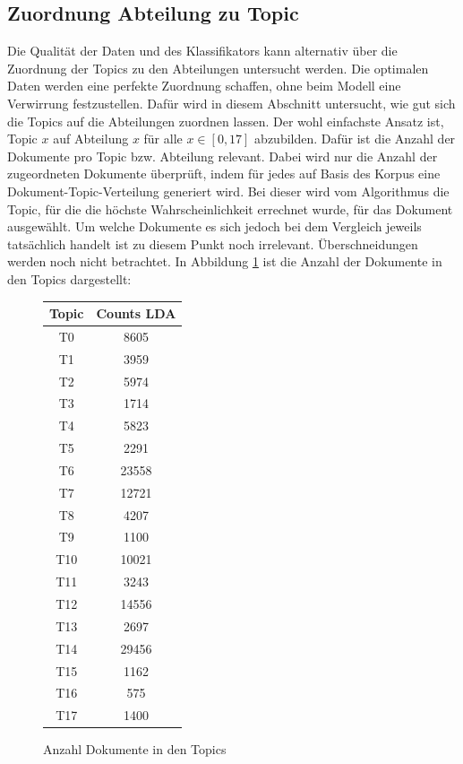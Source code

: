 \documentclass[german,version-2020-11]{uzl-thesis}
\begin{document}
\subsection{Zuordnung Abteilung zu Topic}
Die Qualität der Daten und des Klassifikators kann alternativ über die Zuordnung der Topics zu den Abteilungen untersucht werden. Die optimalen Daten werden eine perfekte Zuordnung schaffen, ohne beim Modell eine Verwirrung festzustellen. Dafür wird in diesem Abschnitt untersucht, wie gut sich die Topics auf die Abteilungen zuordnen lassen. Der wohl einfachste Ansatz ist, Topic $x$ auf Abteilung $x$ für alle $x \in [0,17]$ abzubilden. Dafür ist die Anzahl der Dokumente pro Topic bzw. Abteilung relevant. Dabei wird nur die Anzahl der zugeordneten Dokumente überprüft, indem für jedes auf Basis des Korpus eine Dokument-Topic-Verteilung generiert wird. Bei dieser wird vom Algorithmus die Topic, für die die höchste Wahrscheinlichkeit errechnet wurde, für das Dokument ausgewählt. Um welche Dokumente es sich jedoch bei dem Vergleich jeweils tatsächlich handelt ist zu diesem Punkt noch irrelevant. Überschneidungen werden noch nicht betrachtet. In Abbildung \ref{fig:count1} ist die Anzahl der Dokumente in den Topics dargestellt:

\begin{figure}[H]
\begin{center}
\begin{tabular}{cc}
\hline 
\hline
Topic&Counts LDA\\
\hline
T0&8605\\
T1&3959\\
T2&5974\\
T3&1714\\
T4&5823\\
T5&2291\\
T6&23558\\
T7&12721\\
T8&4207\\
T9&1100\\
T10&10021\\
T11&3243\\
T12&14556\\
T13&2697\\
T14&29456\\
T15&1162\\
T16&575\\
T17&1400\\
\hline
\hline
\end{tabular}
\caption{Anzahl Dokumente in den Topics}
\label{fig:count1}
\end{center}
\end{figure}
\end{document}
